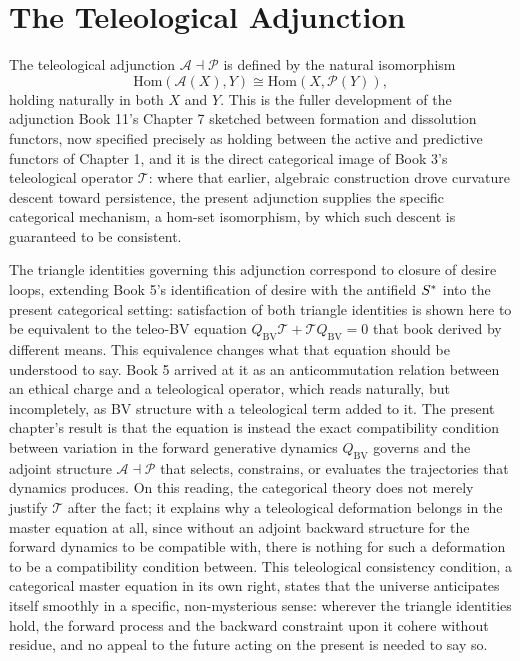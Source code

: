 \chapter{The Teleological Adjunction}

The teleological adjunction $\mathcal{A} \dashv \mathcal{P}$ is defined by the natural isomorphism
\[
\mathrm{Hom}(\mathcal{A}(X), Y) \cong \mathrm{Hom}(X, \mathcal{P}(Y)),
\]
holding naturally in both $X$ and $Y$. This is the fuller development of the adjunction Book 11's Chapter 7 sketched between formation and dissolution functors, now specified precisely as holding between the active and predictive functors of Chapter 1, and it is the direct categorical image of Book 3's teleological operator $\mathcal{T}$: where that earlier, algebraic construction drove curvature descent toward persistence, the present adjunction supplies the specific categorical mechanism, a hom-set isomorphism, by which such descent is guaranteed to be consistent.

The triangle identities governing this adjunction correspond to closure of desire loops, extending Book 5's identification of desire with the antifield $S^{*}$ into the present categorical setting: satisfaction of both triangle identities is shown here to be equivalent to the teleo-BV equation $Q_{\text{BV}}\mathcal{T} + \mathcal{T} Q_{\text{BV}} = 0$ that book derived by different means. This equivalence changes what that equation should be understood to say. Book 5 arrived at it as an anticommutation relation between an ethical charge and a teleological operator, which reads naturally, but incompletely, as BV structure with a teleological term added to it. The present chapter's result is that the equation is instead the exact compatibility condition between variation in the forward generative dynamics $Q_{\text{BV}}$ governs and the adjoint structure $\mathcal{A} \dashv \mathcal{P}$ that selects, constrains, or evaluates the trajectories that dynamics produces. On this reading, the categorical theory does not merely justify $\mathcal{T}$ after the fact; it explains why a teleological deformation belongs in the master equation at all, since without an adjoint backward structure for the forward dynamics to be compatible with, there is nothing for such a deformation to be a compatibility condition between. This teleological consistency condition, a categorical master equation in its own right, states that the universe anticipates itself smoothly in a specific, non-mysterious sense: wherever the triangle identities hold, the forward process and the backward constraint upon it cohere without residue, and no appeal to the future acting on the present is needed to say so.

